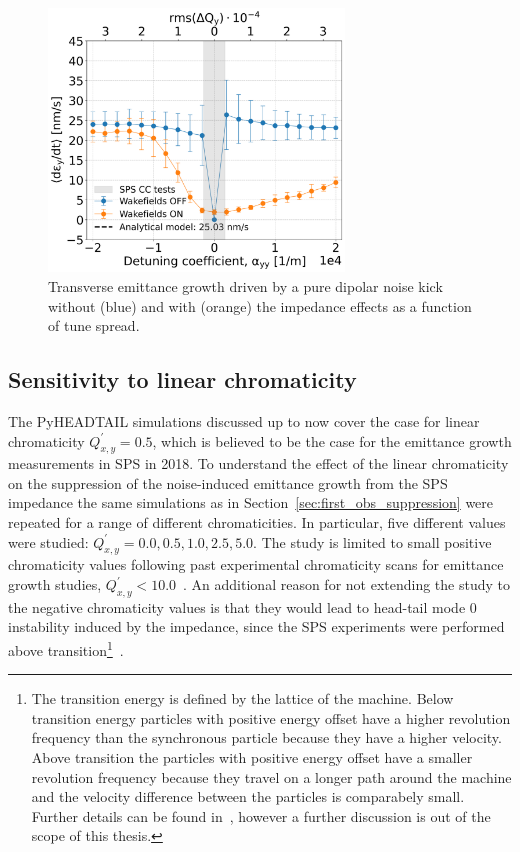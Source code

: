 \begin{figure}[!h] %
    \centering         
    \includegraphics[width=0.7\textwidth]{images/Ch7/deyRates_final_2018_PN_sps_270GeV_DipoleNoiseSQRT1e-8_y-plane_QpxQpy5e-1_6D_Nb5e5_intensity3e10_ayyScan_wakesON_vs_OFF_vs_TuneSpreadvsExpectedSPS.png}
        \caption{Transverse emittance growth driven by a pure dipolar noise kick without (blue) and with (orange) the impedance effects as a function of tune spread.}
        \label{fig:study_5_dipole_noise}
 \end{figure}

\subsection{Sensitivity to linear chromaticity}\label{subsec:chroma_scan}
The PyHEADTAIL simulations discussed up to now cover the case for linear chromaticity $Q^\prime_{x,y}=0.5$, which is believed to be the case for the emittance growth measurements in SPS in 2018. To understand the effect of the linear chromaticity on the suppression of the noise-induced emittance growth from the SPS impedance the same simulations as in Section~\ref{sec:first_obs_suppression} were repeated for a range of different chromaticities. In particular, five different values were studied: $Q^\prime_{x,y}=0.0, 0.5, 1.0, 2.5, 5.0$. The study is limited to small positive chromaticity values following past experimental chromaticity scans for emittance growth studies,  $Q^\prime_{x,y}< 10.0$~\cite{Antoniou:2649815, Calaga:1451286}. An additional reason for not extending the study to the negative chromaticity values is that they would lead to head-tail mode 0 instability induced by the impedance, since the SPS experiments were performed above transition\footnote{The transition energy is defined by the lattice of the machine. Below transition energy particles with positive energy offset have a higher revolution frequency than the synchronous particle because they have a higher velocity.  Above transition the particles with positive energy offset have a smaller revolution frequency because they travel on a longer path around the machine and the velocity difference between the particles is comparabely small. Further details can be found in~\cite{wolski2014}, however a further discussion is out of the scope of this thesis.}~\cite{Chao:collective}.

